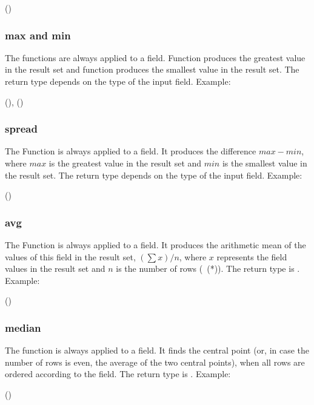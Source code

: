  ()  

\subsubsection{max and min}
The functions are always applied to a field.
Function  produces the greatest value in the result set
and function  produces the smallest value in the result set.
The return type depends on the type of the input field.
Example:

 (), ()
 

\subsubsection{spread}
The Function is always applied to a field.
It produces the difference $max - min$,
where $max$ is the greatest value in the result set
and $min$ is the smallest value in the result set.
The return type depends on the type of the input field.
Example:

 ()
 

\subsubsection{avg}
The Function is always applied to a field.
It produces the arithmetic mean of the values
of this field in the result set, \ie
$\left(\sum{x}\right)/n$, where $x$ represents the
field values in the result set and $n$
is the number of rows (\ie\ (*)).
The return type is .
Example:

 ()
 

\subsubsection{median}
The function is always applied to a field.
It finds the central point (or, in case
the number of rows is even, the average
of the two central points), when all
rows are ordered according to the field.
The return type is .
Example:

 ()
 

